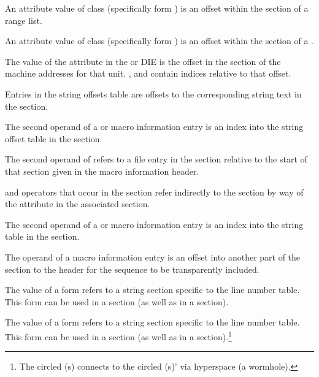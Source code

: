 \begin{description}
An attribute value of class  
(specifically form
\DWFORMsecoffset) 
is an offset within the \dotdebugranges{} section of
a range list.

An attribute value of class  
(specifically form
\DWFORMsecoffset) 
is an offset within the \dotdebugloc{} 
section of a
.

The value of the \DWATaddrbase{} attribute in the
\DWTAGcompileunit{} or \DWTAGpartialunit{} DIE is the
offset in the \dotdebugaddr{} section of the machine
addresses for that unit.
\DWFORMaddrx, \DWOPaddrx{} and \DWOPconstx{} contain
indices relative to that offset.

Entries in the string offsets table
are offsets to the corresponding string text in the 
\dotdebugstr{} section.

The second operand of a 
\DWMACROdefineindirectx{} or \DWMACROundefindirectx{} 
macro information entry is an index
into the string offset table in the 
\dotdebugstroffsets{} section.

The second operand of 
\DWMACROstartfile{} refers to a file entry in the 
\dotdebugline{} section relative to the start 
of that section given in the macro information header.

\DWOPaddrx{} and \DWOPconstx{} operators that occur in the 
\dotdebugloc{} section refer indirectly to the 
\dotdebugaddr{} section by way of the 
\DWATaddrbase{} attribute in the associated \dotdebuginfo{} 
section.

The second operand of a 
\DWMACROdefineindirect{} or \DWMACROundefindirect{} macro information
entry is an index into the string table in the 
\dotdebugstr{} section.

The operand of a 
\DWMACROtransparentinclude{} macro information
entry is an offset into another part of the 
\dotdebugmacro{} section to the header for the 
sequence to be transparently included.

The value of a \DWFORMlinestrp{} form refers to a
string section specific to the line number table.
This form can be used in a \dotdebugline{} section
(as well as in a \dotdebuginfo{} section).

The value of a \DWFORMlinestrp{} form refers to a
string section specific to the line number table.
This form can be used in a \dotdebuginfo{} section
(as well as in a \dotdebugline{} section).\footnote{ 
The circled (s) connects to the circled
(s)' via hyperspace (a wormhole).}
 
\end{description}
